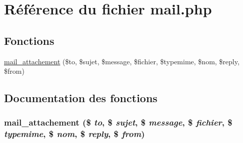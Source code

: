 \hypertarget{mail_8php}{
\section{R\'{e}f\'{e}rence du fichier mail.php}
\label{mail_8php}
}
\subsection*{Fonctions}
\begin{CompactItemize}
\item 
\hyperlink{mail_8php_a0}{mail\_\-attachement} (\$to, \$sujet, \$message, \$fichier, \$typemime, \$nom, \$reply, \$from)
\end{CompactItemize}


\subsection{Documentation des fonctions}
\hypertarget{mail_8php_a0}{
\subsubsection[mail\_\-attachement]{\setlength{\rightskip}{0pt plus 5cm}mail\_\-attachement (\$ {\em to}, \$ {\em sujet}, \$ {\em message}, \$ {\em fichier}, \$ {\em typemime}, \$ {\em nom}, \$ {\em reply}, \$ {\em from})}}
\label{mail_8php_a0}



